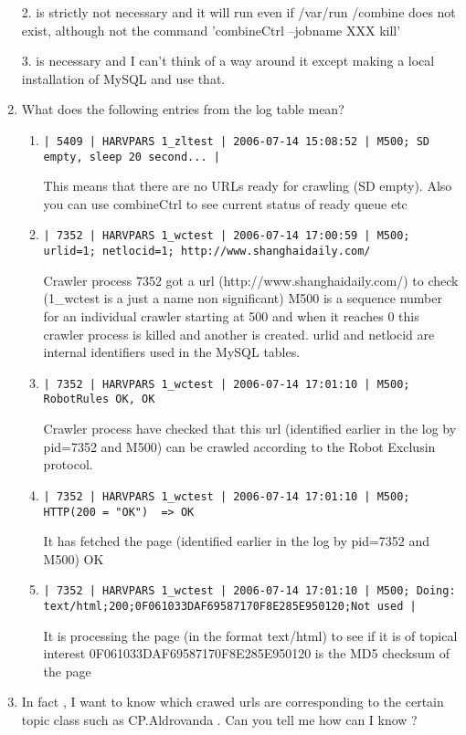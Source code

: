 \begin{enumerate}
2. is strictly not necessary and it will run even if /var/run /combine does not exist, although not
   the command 'combineCtrl --jobname XXX kill'

3. is necessary and I can't think of a way around it except making a local installation of MySQL and use
that.

\item What does the following entries from the log table mean?
\begin{enumerate}
\item
\verb+| 5409 | HARVPARS 1_zltest | 2006-07-14 15:08:52 | M500; SD empty, sleep 20 second... |+

This means that there are no URLs ready for crawling (SD empty).
Also you can use combineCtrl to see current status of ready queue etc


\item
\verb+| 7352 | HARVPARS 1_wctest | 2006-07-14 17:00:59 | M500; urlid=1; netlocid=1; http://www.shanghaidaily.com/+

Crawler process 7352 got a url (http://www.shanghaidaily.com/) to check
(1\_wctest is a just a name non significant)
M500 is a sequence number for an individual crawler starting at 500 and when it reaches 0 this crawler
process is killed and another is created.
urlid and netlocid are internal identifiers used in the MySQL tables.

\item
\verb+| 7352 | HARVPARS 1_wctest | 2006-07-14 17:01:10 | M500; RobotRules OK, OK+

Crawler process have checked that this url (identified earlier in the log by pid=7352 and M500) can be crawled according to the Robot Exclusin protocol.

\item
\verb+| 7352 | HARVPARS 1_wctest | 2006-07-14 17:01:10 | M500; HTTP(200 = "OK")  => OK+

It has fetched the page (identified earlier in the log by pid=7352 and M500) OK

\item
\verb+| 7352 | HARVPARS 1_wctest | 2006-07-14 17:01:10 | M500; Doing: text/html;200;0F061033DAF69587170F8E285E950120;Not used |+

It is processing the page (in the format text/html) to see if it is of topical interest
0F061033DAF69587170F8E285E950120 is the MD5 checksum of the page
\end{enumerate}

\item
In fact , I  want to  know  which  crawed  urls  are  corresponding  to      the  certain  topic  class
such as CP.Aldrovanda . Can you tell me how can I know ?


\end{enumerate}
